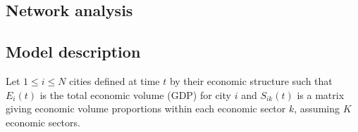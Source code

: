\documentclass{article}
\begin{document}



\subsection{Network analysis}





\subsection{Model description}

Let $1 \leq i \leq N$ cities defined at time $t$ by their economic structure such that $E_i(t)$ is the total economic volume (GDP) for city $i$ and $S_{ik}(t)$ is a matrix giving economic volume proportions within each economic sector $k$, assuming $K$ economic sectors.

\end{document}
